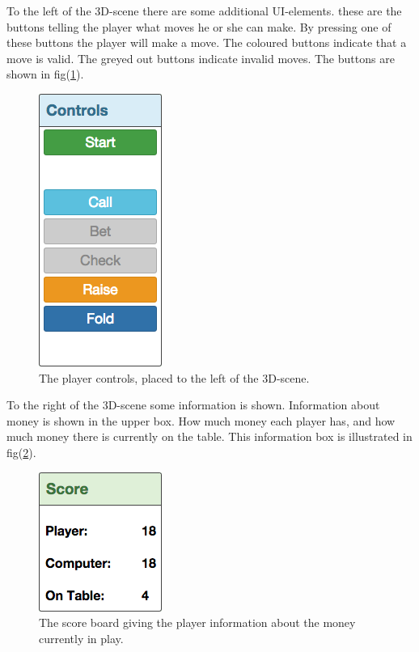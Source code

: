 \documentclass[journal]{vgtc}                %
\begin{document}
To the left of the 3D-scene there are some additional UI-elements. these are the buttons telling the player what moves he or she can make. By pressing one of these buttons the player will make a move. The coloured buttons indicate that a move is valid. The greyed out buttons indicate invalid moves. The buttons are shown in fig(\ref{fig:ui1}).
\begin{figure}[here]
  \begin{center}
    \includegraphics[scale=0.50]{img/ui1.png}
    \caption{\label{fig:ui1} The player controls, placed to the left of the 3D-scene.}
  \end{center}
\end{figure}

To the right of the 3D-scene some information is shown. Information about money is shown in the upper box. How much money each player has, and how much money there is currently on the table. This information box is illustrated in fig(\ref{fig:ui2}).
\begin{figure}[here]
  \begin{center}
    \includegraphics[scale=0.50]{img/ui2.png}
    \caption{\label{fig:ui2} The score board giving the player information about the money currently in play.}
  \end{center}
\end{figure}
\end{document}
